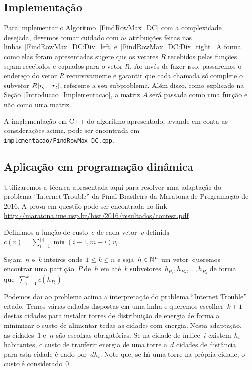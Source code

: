 \subsection{Implementação} \label{DivisaoEConquista_Implementacao}
Para implementar o Algoritmo~\ref{FindRowMax_DC} com a complexidade desejada, devemos tomar cuidado com as atribuições feitas nas linhas~\ref{FindRowMax_DC:Div_left} e~\ref{FindRowMax_DC:Div_right}. A forma como elas foram apresentadas sugere que os vetores $R$ recebidos pelas funções sejam recebidos e copiados para o vetor $R$. Ao invés de fazer isso, passaremos o endereço do vetor $R$ recursivamente e garantir que cada chamada só complete o subvetor $R[r_c \,.\,.\, r_t]$, referente a seu subproblema. Além disso, como explicado na Seção~\ref{Introducao_Implementacao}, a matriz $A$ será passada como uma função e não como uma matriz.

A implementação em C++ do algoritmo apresentado, levando em conta as considerações acima, pode ser encontrada em \texttt{implementacao/FindRowMax\_DC.cpp}.

\subsection{Aplicação em programação dinâmica} \label{DivConq:DP}
Utilizaremos a técnica apresentada aqui para resolver uma adaptação do problema ``Internet Trouble'' da Final Brasileira da Maratona de Programação de 2016. A prova em questão pode ser encontrada no link \url{http://maratona.ime.usp.br/hist/2016/resultados/contest.pdf}.  

\begin{prob} \label{DivConq:InternetTrouble}
Definimos a função de custo~$c$ de cada vetor~$v$ definida~$c(v) = \sum \limits_{i=1}^{|v|} \min(i-1,m-i)v_i$.  

Sejam~$n$ e~$k$ inteiros onde~$1 \leq k \leq n$ e seja~$h \in \mathbb{N}^n$ um vetor, queremos encontrar uma partição~$P$ de~$h$ em até~$k$ subvetores~$h_{P_1},h_{P_2},\dots,h_{P_k}$ de forma que~$\sum \limits_{i=1}^k c(h_{P_i})$.
\end{prob}

Podemos dar ao problema acima a interpretação do problema ``Internet Trouble'' citado. Temos várias cidades dispostas em uma linha e queremos escolher~$k + 1$ destas cidades para instalar torres de distribuição de energia de forma a minimizar o custo de alimentar todas as cidades com energia. Nesta adaptação, as cidades~$1$ e~$n$ são escolhas obrigatórias. Se na cidade de índice~$i$ existem~$h_i$ habitantes, o custo de tranferir energia de uma torre a~$d$ cidades de distância para esta cidade é dado por~$dh_i$. Note que, se há uma torre na própria cidade, o custo é considerado~$0$.  

